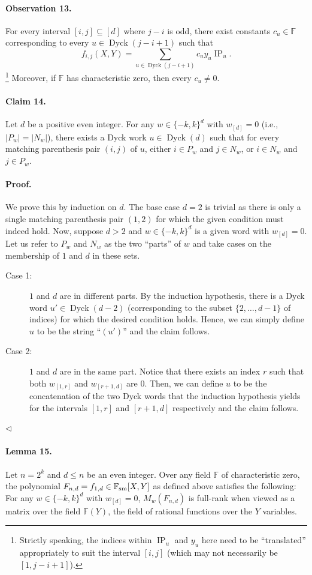 \paragraph{Observation 13.} For every interval $[i,j]\subseteq[d]$ where $j-i$ is odd, there exist constants $c_u\in\mathbb F$ corresponding to every $u\in\operatorname{Dyck}(j-i+1)$ such that
\[f_{i,j}(X,Y)=\sum_{u\in\operatorname{Dyck}(j-i+1)}c_u y_u\operatorname{IP}_u.\]\footnote{Strictly speaking, the indices within $\operatorname{IP}_u$ and $y_u$ here need to be ``translated'' appropriately to suit the interval $[i,j]$ (which may not necessarily be $[1,j-i+1]$).}
Moreover, if $\mathbb F$ has characteristic zero, then every $c_u\neq0$.
\paragraph{Claim 14.} Let $d$ be a positive even integer. For any $w\in\{-k,k\}^d$ with $w_{[d]}=0$ (i.e., $|P_w|=|N_w|$), there exists a Dyck work $u\in\operatorname{Dyck}(d)$ such that for every matching parenthesis pair $(i,j)$ of $u$, either $i\in P_w$ and $j\in N_w$, or $i\in N_w$ and $j\in P_w$.
\paragraph{Proof.} We prove this by induction on $d$. The base case $d=2$ is trivial as there is only a single matching parenthesis pair $(1,2)$ for which the given condition must indeed hold. Now, suppose $d>2$ and $w\in\{-k,k\}^d$ is a given word with $w_{[d]}=0$. Let us refer to $P_w$ and $N_w$ as the two ``parts'' of $w$ and take cases on the membership of $1$ and $d$ in these sets.
\begin{description}
\item[Case 1:] $1$ and $d$ are in different parts. By the induction hypothesis, there is a Dyck word $u'\in\operatorname{Dyck}(d-2)$ (corresponding to the subset $\{2,\ldots,d-1\}$ of indices) for which the desired condition holds. Hence, we can simply define $u$ to be the string ``$(u')$'' and the claim follows.
\item[Case 2:] $1$ and $d$ are in the same part. Notice that there exists an index $r$ such that both $w_{[1,r]}$ and $w_{[r+1,d]}$ are $0$. Then, we can define $u$ to be the concatenation of the two Dyck words that the induction hypothesis yields for the intervals $[1,r]$ and $[r+1,d]$ respectively and the claim follows.
\end{description}\hfill$\triangleleft$
\paragraph{Lemma 15.} Let $n=2^k$ and $d\leq n$ be an even integer. Over any field $\mathbb F$ of characteristic zero, the polynomial $F_{n,d}=f_{1,d}\in\mathbb F_{\rm sm}[X,Y]$ as defined above satisfies the following: For any $w\in\{-k,k\}^d$ with $w_{[d]}=0$, $M_w(F_{n,d})$ is full-rank when viewed as a matrix over the field $\mathbb F(Y)$, the field of rational functions over the $Y$ variables.
